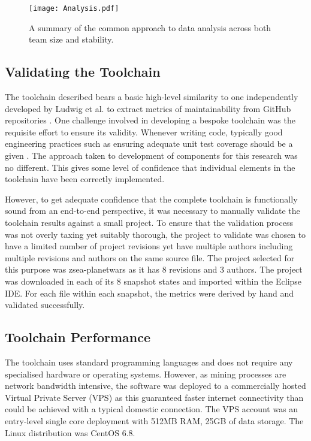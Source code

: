  \begin{figure}[htbp!] 
 \centering    
 \texttt{[image: Analysis.pdf]}
 \caption[A summary of the data analysis approach.]{A summary of the common approach to data analysis across both team size and stability.}
 \label{fig:Analysis}
 \end{figure}

\subsection{Validating the Toolchain}
The toolchain described bears a basic high-level similarity to one independently developed by Ludwig et al. to extract metrics of maintainability from GitHub repositories \citep{ludwig2017compiling}. One challenge involved in developing a bespoke toolchain was the requisite effort to ensure its validity. Whenever writing code, typically good engineering practices such as ensuring adequate unit test coverage should be a given \citep{tosun2018effectiveness}. The approach taken to development of components for this research was no different. This gives some level of confidence that individual elements in the toolchain have been correctly implemented. 

However, to get adequate confidence that the complete toolchain is functionally sound from an end-to-end perspective, it was necessary to manually validate the toolchain results against a small project. To ensure that the validation process was not overly taxing yet suitably thorough, the project to validate was chosen to have a limited number of project revisions yet have multiple authors including multiple revisions and authors on the same source file. The project selected for this purpose was zsea-planetwars as it has 8 revisions and 3 authors. The project was downloaded in each of its 8 snapshot states and imported within the Eclipse IDE. For each file within each snapshot, the metrics were derived by hand and validated successfully.

\subsection{Toolchain Performance}
The toolchain uses standard programming languages and does not require any specialised hardware or operating systems. However, as mining processes are network bandwidth intensive, the software was deployed to a commercially hosted Virtual Private Server (VPS) as this guaranteed faster internet connectivity than could be achieved with a typical domestic connection. The VPS account was an entry-level single core deployment with 512MB RAM, 25GB of data storage. The Linux distribution was CentOS 6.8.

